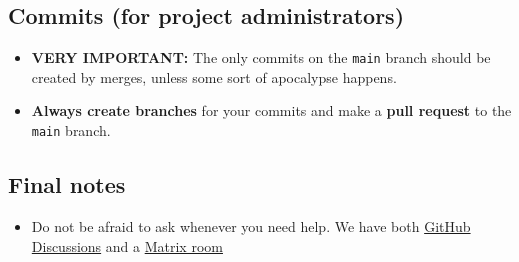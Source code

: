 \subsection{Commits (for project
administrators)}\label{commits-for-project-administrators}

\begin{itemize}
\item
  \textbf{VERY IMPORTANT:} The only commits on the \texttt{main} branch
  should be created by merges, unless some sort of apocalypse happens.
\item
  \textbf{Always create branches} for your commits and make a
  \textbf{pull request} to the \texttt{main} branch.
\end{itemize}

\subsection{Final notes}\label{final-notes}

\begin{itemize}
\item
  Do not be afraid to ask whenever you need help. We have both
  \href{https://github.com/Sparkles-Laurel/lament/discussions/10}{GitHub
  Discussions} and a
  \href{https://matrix.to/\#/\#lament-contrib:platypus-sandbox.com}{Matrix
  room}
\end{itemize}
